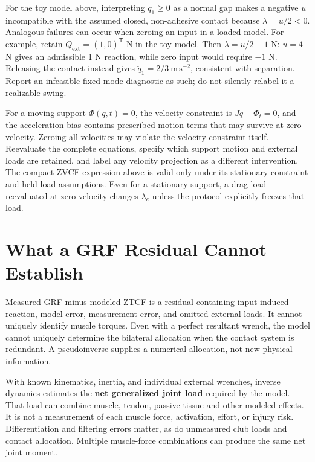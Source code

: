 For the toy model above, interpreting \(q_1\geq0\) as a normal gap makes a negative \(u\) incompatible with the assumed closed, non-adhesive contact because \(\lambda=u/2<0\). Analogous failures can occur when zeroing an input in a loaded model. For example, retain \(Q_{\mathrm{ext}}=(1,0)^\mathsf{T}\) N in the toy model. Then \(\lambda=u/2-1\) N: \(u=4\) N gives an admissible 1 N reaction, while zero input would require \(-1\) N. Releasing the contact instead gives \(\ddot q_1=2/3\ \mathrm{m\,s^{-2}}\), consistent with separation. Report an infeasible fixed-mode diagnostic as such; do not silently relabel it a realizable swing.

For a moving support \(\Phi(q,t)=0\), the velocity constraint is \(J\dot q+\Phi_t=0\), and the acceleration bias contains prescribed-motion terms that may survive at zero velocity. Zeroing all velocities may violate the velocity constraint itself. Reevaluate the complete equations, specify which support motion and external loads are retained, and label any velocity projection as a different intervention. The compact ZVCF expression above is valid only under its stationary-constraint and held-load assumptions. Even for a stationary support, a drag load reevaluated at zero velocity changes \(\lambda_e\) unless the protocol explicitly freezes that load.

\section{What a GRF Residual Cannot Establish}\label{grf-what-a-grf-residual-cannot-establish}

Measured GRF minus modeled ZTCF is a residual containing input-induced reaction, model error, measurement error, and omitted external loads. It cannot uniquely identify muscle torques. Even with a perfect resultant wrench, the model cannot uniquely determine the bilateral allocation when the contact system is redundant. A pseudoinverse supplies a numerical allocation, not new physical information.

With known kinematics, inertia, and individual external wrenches, inverse dynamics estimates the \textbf{net generalized joint load} required by the model. That load can combine muscle, tendon, passive tissue and other modeled effects. It is not a measurement of each muscle force, activation, effort, or injury risk. Differentiation and filtering errors matter, as do unmeasured club loads and contact allocation. Multiple muscle-force combinations can produce the same net joint moment.

